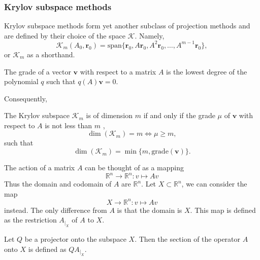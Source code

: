 \subsubsection{Krylov subspace methods}
Krylov subspace methods form yet another subclass of projection methods and are defined by their choice of the space $\mathcal{K}$. Namely,
\begin{equation}
  \mathcal{K}_m(A_0, \mathbf{r}_0) = \text{span}\{\mathbf{r}_0, A\mathbf{r}_0, A^2\mathbf{r}_0, \dots, A^{m-1}\mathbf{r}_0\},
  \label{eq:cg_krylov_space}
\end{equation}
or $\mathcal{K}_m$ as a shorthand. 
\begin{definition}
  The grade of a vector $\mathbf{v}$ with respect to a matrix $A$ is the lowest degree of the polynomial $q$ such that $q(A)\mathbf{v} = 0$.
  \label{def:cg_grade}
\end{definition}
Consequently,
\begin{theorem}
  The Krylov subspace $\mathcal{K}_m$ is of dimension $m$ if and only if the grade $\mu$ of $\mathbf{v}$ with respect to $A$ is not less than $m$ \cite[proposition 6.2]{iter_method_saad},
  \begin{equation*}
    \dim(\mathcal{K}_m) = m \iff \mu \geq m,
  \end{equation*}
  such that
  \begin{equation}
    \dim(\mathcal{K}_m) = \min \{m, \textrm{grade}(\mathbf{v})\}.
    \label{eq:cg_krylov_dimension}
  \end{equation}
  \label{th:cg_krylov_dimension}
\end{theorem}

\begin{definition}
  The action of a matrix $A$ can be thought of as a mapping
  \begin{equation*}
    \mathbb{R}^n \rightarrow \mathbb{R}^n: v \mapsto A v
  \end{equation*}
  Thus the domain and codomain of $A$ are $\mathbb{R}^n$. Let $X \subset \mathbb{R}^n$, we can consider the map
  \begin{equation*}
    X \rightarrow \mathbb{R}^n: v \mapsto A v
  \end{equation*}
  instead. The only difference from $A$ is that the domain is $X$. This map is defined as the restriction $A_{\left.\right|_X}$ of $A$ to $X$.
\end{definition}

\begin{definition}
  Let $Q$ be a projector onto the subspace $X$. Then the section of the operator $A$ onto $X$ is defined as $QA_{\left.\right|_X}$.
\end{definition}

